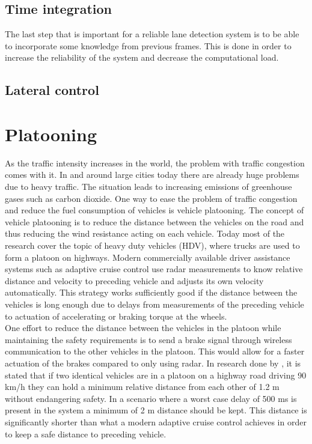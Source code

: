 \subsection{Time integration}
The last step that is important for a reliable lane detection system is to be able to incorporate some knowledge from previous frames. This is done in order to increase the reliability of the system and decrease the computational load.

\subsection{Lateral control}


\section{Platooning}
As the traffic intensity increases in the world, the problem with traffic congestion comes with it. In and around large cities today there are already huge problems due to heavy traffic. The situation leads to increasing emissions of greenhouse gases such as carbon dioxide. One way to ease the problem of traffic congestion and reduce the fuel consumption of vehicles is vehicle platooning. The concept of vehicle platooning is to reduce the distance between the vehicles on the road and thus reducing the wind resistance acting on each vehicle. Today most of the research cover the topic of heavy duty vehicles (HDV), where trucks are used to form a platoon on highways. Modern commercially available driver assistance systems such as adaptive cruise control use radar measurements to know relative distance and velocity to preceding vehicle and adjusts its own velocity automatically. This strategy works sufficiently good if the distance between the vehicles is long enough due to delays from measurements of the preceding vehicle to actuation of accelerating or braking torque at the wheels.\\

One effort to reduce the distance between the vehicles in the platoon while maintaining the safety requirements is to send a brake signal through wireless communication to the other vehicles in the platoon. This would allow for a faster actuation of the brakes compared to only using radar. In research done by \cite{alam2014guaranteeing}, it is stated that if two identical vehicles are in a platoon on a highway road driving 90 km/h they can hold a minimum relative distance from each other of 1.2 m without endangering safety. In a scenario where a worst case delay of 500 ms is present in the system a minimum of 2 m distance should be kept. This distance is significantly shorter than what a modern adaptive cruise control achieves in order to keep a safe distance to preceding vehicle.\\


